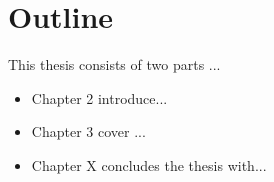 
\section{Outline}\label{sec:intro:outline}

This thesis consists of two parts ...

\begin{itemize}
    \item Chapter 2 introduce...
    \item Chapter 3 cover ...
    \item Chapter X concludes the thesis with...
\end{itemize}

